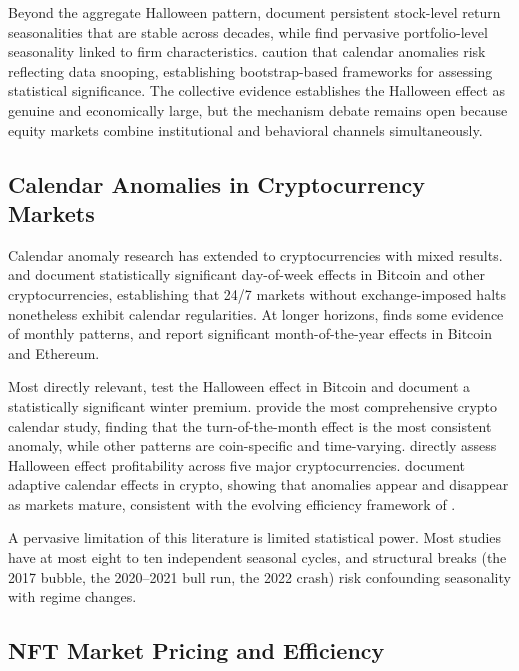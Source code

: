 \documentclass[12pt,a4paper]{article}
\begin{document}
Beyond the aggregate Halloween pattern, \citet{KeloharjuLinnainmaaNyberg2016} document persistent stock-level return seasonalities that are stable across decades, while \citet{HestonSadka2008} find pervasive portfolio-level seasonality linked to firm characteristics. \citet{SullivanTimmermann2001} caution that calendar anomalies risk reflecting data snooping, establishing bootstrap-based frameworks for assessing statistical significance. The collective evidence establishes the Halloween effect as genuine and economically large, but the mechanism debate remains open because equity markets combine institutional and behavioral channels simultaneously.

\subsection{Calendar Anomalies in Cryptocurrency Markets}

Calendar anomaly research has extended to cryptocurrencies with mixed results. \citet{AharonQadan2019} and \citet{CaporalePlastun2019} document statistically significant day-of-week effects in Bitcoin and other cryptocurrencies, establishing that 24/7 markets without exchange-imposed halts nonetheless exhibit calendar regularities. At longer horizons, \citet{Kaiser2019} finds some evidence of monthly patterns, and \citet{PlastunDrofa2019} report significant month-of-the-year effects in Bitcoin and Ethereum.

Most directly relevant, \citet{KinatederPapavassiliou2021} test the Halloween effect in Bitcoin and document a statistically significant winter premium. \citet{QadanAharonEichel2022} provide the most comprehensive crypto calendar study, finding that the turn-of-the-month effect is the most consistent anomaly, while other patterns are coin-specific and time-varying. \citet{VasileiouFloros2025} directly assess Halloween effect profitability across five major cryptocurrencies. \citet{KhuntiaPattanayak2022} document adaptive calendar effects in crypto, showing that anomalies appear and disappear as markets mature, consistent with the evolving efficiency framework of \citet{Urquhart2016}.

A pervasive limitation of this literature is limited statistical power. Most studies have at most eight to ten independent seasonal cycles, and structural breaks (the 2017 bubble, the 2020--2021 bull run, the 2022 crash) risk confounding seasonality with regime changes.

\subsection{NFT Market Pricing and Efficiency}
\end{document}
